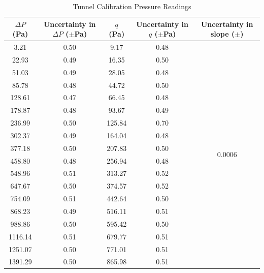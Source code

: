 \documentclass[journal,letterpaper]{IEEEtran}
\begin{document}
\begin{table}[H]
    \centering
    \caption{Tunnel Calibration Pressure Readings}
    \begin{tabular}{ccccc}
    \toprule
    $\Delta P$ (\unit{\pascal}) & \makecell{Uncertainty \\ in $\Delta P$ ($\pm$\unit{\pascal})} & $q$ (\unit{\pascal}) & \makecell{Uncertainty \\ in $q$ ($\pm$\unit{\pascal})} & \makecell{Uncertainty \\ in slope ($\pm$)} \\ \midrule \midrule
    3.21    & 0.50 & 9.17   & 0.48 & \multirow{18}{*}{0.0006} \\
    22.93   & 0.49 & 16.35  & 0.50 &                          \\
    51.03   & 0.49 & 28.05  & 0.48 &                          \\
    85.78   & 0.48 & 44.72  & 0.50 &                          \\
    128.61  & 0.47 & 66.45  & 0.48 &                          \\
    178.87  & 0.48 & 93.67  & 0.49 &                          \\
    236.99  & 0.50 & 125.84 & 0.70 &                          \\
    302.37  & 0.49 & 164.04 & 0.48 &                          \\
    377.18  & 0.50 & 207.83 & 0.50 &                          \\
    458.80  & 0.48 & 256.94 & 0.48 &                          \\
    548.96  & 0.51 & 313.27 & 0.52 &                          \\
    647.67  & 0.50 & 374.57 & 0.52 &                          \\
    754.09  & 0.51 & 442.64 & 0.50 &                          \\
    868.23  & 0.49 & 516.11 & 0.51 &                          \\
    988.86  & 0.50 & 595.42 & 0.50 &                          \\
    1116.14 & 0.51 & 679.77 & 0.51 &                          \\
    1251.07 & 0.50 & 771.01 & 0.51 &                          \\
    1391.29 & 0.50 & 865.98 & 0.51 &                          \\ \bottomrule
    \end{tabular}
    \label{tab:avgdData}
\end{table}
\end{document}
